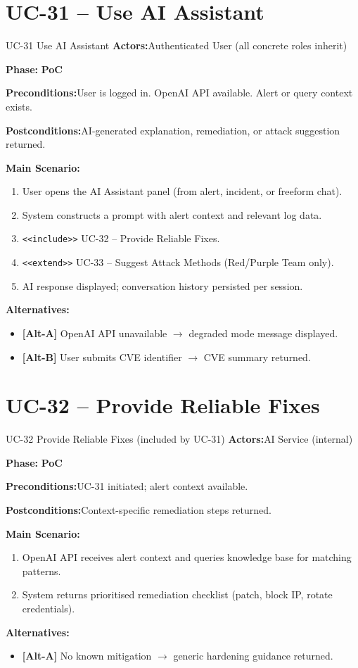 \documentclass[12pt,a4paper]{report}
\newcommand{\ucfield}[2]{%
    \noindent\textbf{\color{helixpurplemid}#1:}\quad #2\par\medskip
}
\newcommand{\ucphase}[1]{%
    \noindent\textbf{\color{helixpurplemid}Phase:}\quad%
    \ifstrequal{#1}{PoC}{\textcolor{helixteal}{\textbf{PoC}}}{\textcolor{helixamber}{\textbf{Future MVP}}}%
    \par\medskip
}
\begin{document}
\section{UC-31 -- Use AI Assistant}
\begin{ucbox}{UC-31 \quad Use AI Assistant}
    \ucfield{Actors}{Authenticated User (all concrete roles inherit)}
    \ucphase{PoC}
    \ucfield{Preconditions}{User is logged in. OpenAI API available. Alert or query context exists.}
    \ucfield{Postconditions}{AI-generated explanation, remediation, or attack suggestion returned.}
    \textbf{\color{helixpurplemid}Main Scenario:}
    \begin{enumerate}
        \item User opens the AI Assistant panel (from alert, incident, or freeform chat).
        \item System constructs a prompt with alert context and relevant log data.
        \item \texttt{<<include>>} UC-32 -- Provide Reliable Fixes.
        \item \texttt{<<extend>>} UC-33 -- Suggest Attack Methods (Red/Purple Team only).
        \item AI response displayed; conversation history persisted per session.
    \end{enumerate}
    \textbf{\color{helixpurplemid}Alternatives:}
    \begin{itemize}
        \item \textbf{[Alt-A]} OpenAI API unavailable $\rightarrow$ degraded mode message displayed.
        \item \textbf{[Alt-B]} User submits CVE identifier $\rightarrow$ CVE summary returned.
    \end{itemize}
\end{ucbox}

\section{UC-32 -- Provide Reliable Fixes}
\begin{ucbox}{UC-32 \quad Provide Reliable Fixes \textnormal{(included by UC-31)}}
    \ucfield{Actors}{AI Service (internal)}
    \ucphase{PoC}
    \ucfield{Preconditions}{UC-31 initiated; alert context available.}
    \ucfield{Postconditions}{Context-specific remediation steps returned.}
    \textbf{\color{helixpurplemid}Main Scenario:}
    \begin{enumerate}
        \item OpenAI API receives alert context and queries knowledge base for matching patterns.
        \item System returns prioritised remediation checklist (patch, block IP, rotate credentials).
    \end{enumerate}
    \textbf{\color{helixpurplemid}Alternatives:}
    \begin{itemize}
        \item \textbf{[Alt-A]} No known mitigation $\rightarrow$ generic hardening guidance returned.
    \end{itemize}
\end{ucbox}
\end{document}
